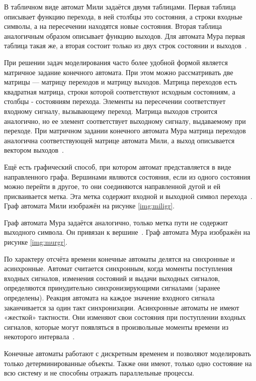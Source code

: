 В табличном виде автомат Мили задаётся двумя таблицами. Первая таблица описывает функцию перехода, в ней столбцы это состояния, а строки входные символы, а на пересечении находятся новые состояния. Вторая таблица аналогичным образом описывает функцию выходов. Для автомата Мура первая таблица такая же, а вторая состоит только из двух строк состоянии и выходов~\cite{ak_types}.

При решении задач моделирования часто более удобной формой является матричное задание конечного автомата. При этом можно рассматривать две матрицы --- матрицу переходов и матрицу выходов. Матрица переходов есть квадратная матрица, строки которой соответствуют исходным состояниям, а столбцы - состояниям перехода. Элементы на пересечении соответствует входному сигналу, вызывающему переход. Матрица выходов строится аналогично, но ее элемент соответствует выходному сигналу, выдаваемому при переходе. При матричном задании конечного автомата Мура матрица переходов аналогична соответствующей матрице автомата Мили, а выход описывается вектором выходов~\cite{ak_types}.

Ещё есть графический способ, при котором автомат представляется в виде направленного графа. Вершинами являются состояния, если из одного состояния можно перейти в другое, то они соединяются направленной дугой и ей присваивается метка. Эта метка содержит входной и выходной символ перехода~\cite{ak_types}. Граф автомата Мили изображён на рисунке \ref{img:miligr}.

\FloatBarrier

Граф автомата Мура задаётся аналогично, только метка пути не содержит выходного символа. Он привязан к вершине~\cite{ak_types}. Граф автомата Мура изображён на рисунке \ref{img:murgr}.

\FloatBarrier

По характеру отсчёта времени конечные автоматы делятся на синхронные и асинхронные. Автомат считается синхронным, когда моменты поступления входных сигналов, изменения состояний и выдачи выходных сигналов, определяются принудительно синхронизирующими сигналами (заранее определены). Реакция автомата на каждое значение входного сигнала заканчивается за один такт синхронизации. Асинхронные автоматы не имеют «жесткой» тактности. Они изменяют свои состояния при поступлении входных сигналов, которые могут появляться в произвольные моменты времени из некоторого интервала~\cite{ak_det}.

Конечные автоматы работают с дискретным временем и позволяют моделировать только детерминированные объекты. Также они имеют, только одно состояние на всю систему и не способны отражать параллельные процессы. 

